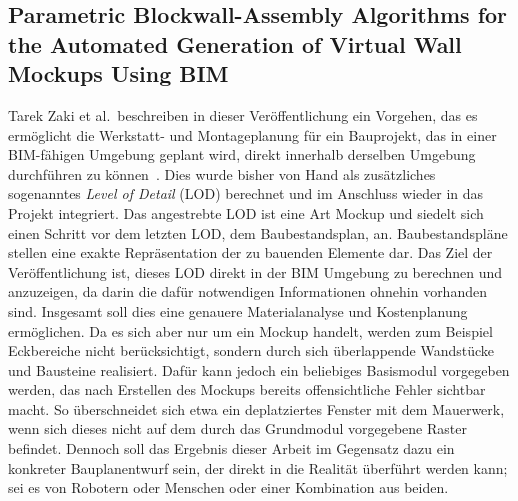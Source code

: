 \subsection{Parametric Blockwall-Assembly Algorithms for the Automated Generation of Virtual Wall Mockups Using BIM}
Tarek Zaki et al.\ beschreiben in dieser Veröffentlichung ein Vorgehen, das es ermöglicht die Werkstatt- und Montageplanung für ein Bauprojekt, das in einer BIM-fähigen Umgebung geplant wird, direkt innerhalb derselben Umgebung durchführen zu können~\cite{Zaki2017}.
Dies wurde bisher von Hand als zusätzliches sogenanntes \textit{Level of Detail} (LOD) berechnet und im Anschluss wieder in das Projekt integriert.
Das angestrebte LOD ist eine Art Mockup und siedelt sich einen Schritt vor dem letzten LOD, dem Baubestandsplan, an.
Baubestandspläne stellen eine exakte Repräsentation der zu bauenden Elemente dar.
Das Ziel der Veröffentlichung ist, dieses LOD direkt in der BIM Umgebung zu berechnen und anzuzeigen, da darin die dafür notwendigen Informationen ohnehin vorhanden sind.
Insgesamt soll dies eine genauere Materialanalyse und Kostenplanung ermöglichen.
Da es sich aber \glqq{}nur\grqq{} um ein Mockup handelt, werden zum Beispiel Eckbereiche nicht berücksichtigt, sondern durch sich überlappende Wandstücke und Bausteine realisiert.
Dafür kann jedoch ein beliebiges Basismodul vorgegeben werden, das nach Erstellen des Mockups bereits offensichtliche Fehler sichtbar macht.
So überschneidet sich etwa ein deplatziertes Fenster mit dem Mauerwerk, wenn sich dieses nicht auf dem durch das Grundmodul vorgegebene Raster befindet.
Dennoch soll das Ergebnis dieser Arbeit im Gegensatz dazu ein konkreter Bauplanentwurf sein, der direkt in die Realität überführt werden kann; sei es von Robotern oder Menschen oder einer Kombination aus beiden.